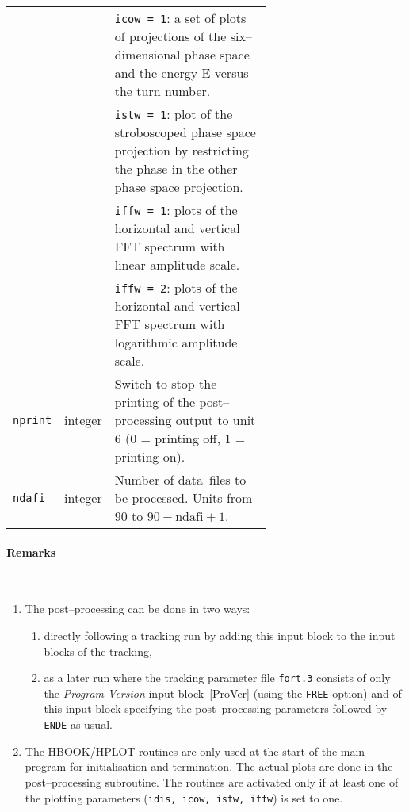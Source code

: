 \begin{longtabu}{@{}llp{0.65\linewidth}}
                          &          & \texttt{icow = 1}: a set of plots of projections of the six--dimensional phase space and the energy E versus the turn number. \\
                          &          & \texttt{istw = 1}: plot of the stroboscoped phase space projection by restricting the phase in the other phase space projection. \\
                          &          & \texttt{iffw = 1}: plots of the horizontal and vertical FFT spectrum with linear amplitude scale. \\
                          &          & \texttt{iffw = 2}: plots of the horizontal and vertical FFT spectrum with logarithmic amplitude scale. \\
    \texttt{nprint}       & integer  & Switch to stop the printing of the post--processing output to unit 6 (0 = printing off, 1 = printing on). \\
    \texttt{ndafi}        & integer  & Number of data--files to be processed. Units from $90$ to $90 - \mbox{ndafi} + 1$.
\end{longtabu}

\paragraph{Remarks}~
\begin{enumerate}
    \item The post--processing can be done in two ways:
    \begin{enumerate}
        \item directly following a tracking run by adding this input block to the input blocks of the tracking,
        \item as a later run where the tracking parameter file \texttt{fort.3} consists of only the \textit{Program Version} input   block~\ref{ProVer} (using the \texttt{FREE} option) and of this input block specifying the post--processing parameters followed by \texttt{ENDE} as usual.
    \end{enumerate}
    \item The HBOOK/HPLOT routines are only used at the start of the main program for initialisation and termination. The actual plots are done in the post--processing subroutine. The routines are activated only if at least one of the plotting parameters (\texttt{idis, icow, istw, iffw}) is set to one.
\end{enumerate}

